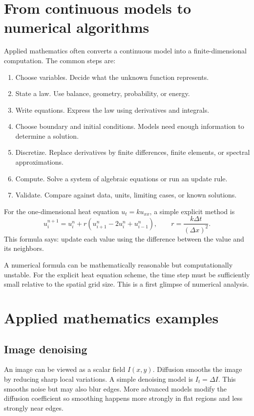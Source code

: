 \documentclass[11pt]{article}
\newcommand{\Lap}{\Delta}
\begin{document}
\section{From continuous models to numerical algorithms}

Applied mathematics often converts a continuous model into a finite-dimensional computation. The common steps are:
\begin{enumerate}
  \item Choose variables. Decide what the unknown function represents.
  \item State a law. Use balance, geometry, probability, or energy.
  \item Write equations. Express the law using derivatives and integrals.
  \item Choose boundary and initial conditions. Models need enough information to determine a solution.
  \item Discretize. Replace derivatives by finite differences, finite elements, or spectral approximations.
  \item Compute. Solve a system of algebraic equations or run an update rule.
  \item Validate. Compare against data, units, limiting cases, or known solutions.
\end{enumerate}

For the one-dimensional heat equation $u_t=ku_{xx}$, a simple explicit method is
\[
u_i^{n+1}=u_i^n+r(u_{i+1}^n-2u_i^n+u_{i-1}^n),
\qquad
r=\frac{k\Delta t}{(\Delta x)^2}.
\]
This formula says: update each value using the difference between the value and its neighbors.

\begin{warningbox}
A numerical formula can be mathematically reasonable but computationally unstable. For the explicit heat equation scheme, the time step must be sufficiently small relative to the spatial grid size. This is a first glimpse of numerical analysis.
\end{warningbox}

\section{Applied mathematics examples}

\subsection*{Image denoising}
An image can be viewed as a scalar field $I(x,y)$. Diffusion smooths the image by reducing sharp local variations. A simple denoising model is $I_t=\Lap I$. This smooths noise but may also blur edges. More advanced models modify the diffusion coefficient so smoothing happens more strongly in flat regions and less strongly near edges.
\end{document}
